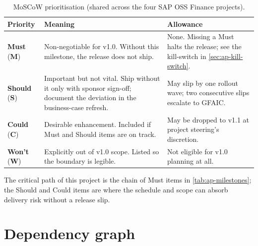 \begin{table}[htbp]
\centering
\caption{MoSCoW prioritisation (shared across the four SAP OSS Finance
projects).}
\label{tab:ap-moscow}
\footnotesize
\begin{tabularx}{\linewidth}{@{}l l X@{}}
\toprule
\textbf{Priority} & \textbf{Meaning} & \textbf{Allowance} \\ \midrule
\textbf{Must} (\textbf{M}) & Non-negotiable for v1.0. Without this milestone, the release does not ship. & None. Missing a Must halts the release; see the kill-switch in \cref{sec:ap-kill-switch}. \\
\textbf{Should} (\textbf{S}) & Important but not vital. Ship without it only with sponsor sign-off; document the deviation in the business-case refresh. & May slip by one rollout wave; two consecutive slips escalate to GFAIC. \\
\textbf{Could} (\textbf{C}) & Desirable enhancement. Included if Must and Should items are on track. & May be dropped to v1.1 at project steering's discretion. \\
\textbf{Won't} (\textbf{W}) & Explicitly out of v1.0 scope. Listed so the boundary is legible. & Not eligible for v1.0 planning at all. \\
\bottomrule
\end{tabularx}
\end{table}

\noindent
The critical path of this project is the chain of Must items in
\cref{tab:ap-milestones}; the Should and Could items are where the
schedule and scope can absorb delivery risk without a release slip.

\section{Dependency graph}\label{sec:ap-dependency-graph}

